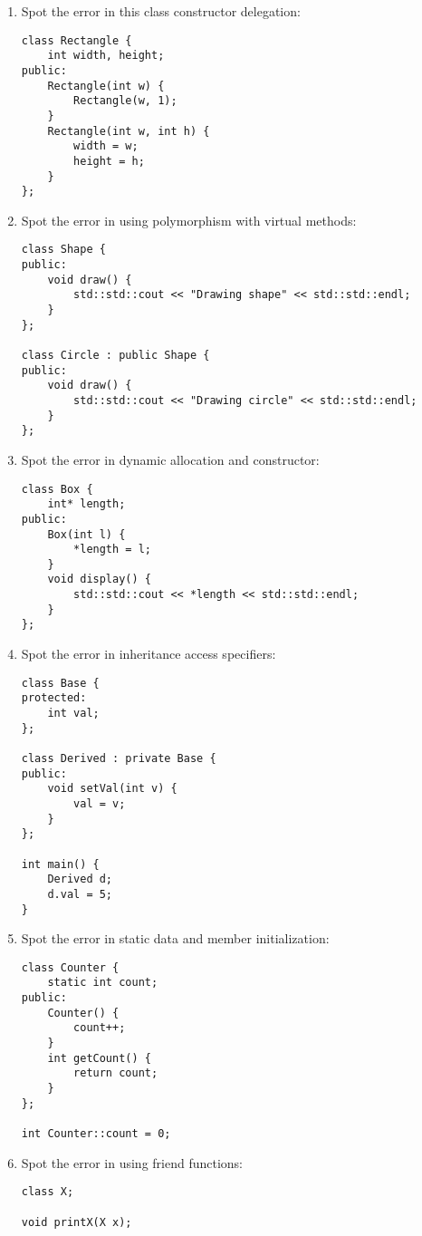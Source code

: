 \documentclass[a4paper,12pt]{article}
\begin{document}
\begin{enumerate}
    \item Spot the error in this class constructor delegation:
\begin{lstlisting}
class Rectangle {
    int width, height;
public:
    Rectangle(int w) {
        Rectangle(w, 1);
    }
    Rectangle(int w, int h) {
        width = w;
        height = h;
    }
};
\end{lstlisting}

    \item Spot the error in using polymorphism with virtual methods:
\begin{lstlisting}
class Shape {
public:
    void draw() {
        std::std::cout << "Drawing shape" << std::std::endl;
    }
};

class Circle : public Shape {
public:
    void draw() {
        std::std::cout << "Drawing circle" << std::std::endl;
    }
};
\end{lstlisting}

    \item Spot the error in dynamic allocation and constructor:
\begin{lstlisting}
class Box {
    int* length;
public:
    Box(int l) {
        *length = l;
    }
    void display() {
        std::std::cout << *length << std::std::endl;
    }
};
\end{lstlisting}

    \item Spot the error in inheritance access specifiers:
\begin{lstlisting}
class Base {
protected:
    int val;
};

class Derived : private Base {
public:
    void setVal(int v) {
        val = v;
    }
};

int main() {
    Derived d;
    d.val = 5;
}
\end{lstlisting}

    \item Spot the error in static data and member initialization:
\begin{lstlisting}
class Counter {
    static int count;
public:
    Counter() {
        count++;
    }
    int getCount() {
        return count;
    }
};

int Counter::count = 0;
\end{lstlisting}

    \item Spot the error in using friend functions:
\begin{lstlisting}
class X;

void printX(X x);


\end{lstlisting}
\end{enumerate}
\end{document}
